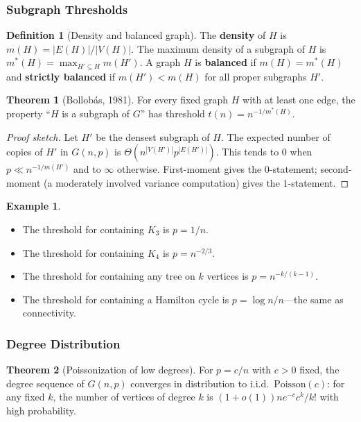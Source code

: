 \documentclass{article}
\theoremstyle{definition}
\newtheorem{example}{Example}
\newtheorem{theorem}{Theorem}
\newtheorem{definition}{Definition}
\begin{document}
\subsubsection{Subgraph Thresholds}

\begin{definition}[Density and balanced graph]
The \textbf{density} of $H$ is $m(H) = |E(H)|/|V(H)|$. The maximum
density of a subgraph of $H$ is $m^*(H) = \max_{H' \subseteq H} m(H')$.
A graph $H$ is \textbf{balanced} if $m(H) = m^*(H)$ and \textbf{strictly balanced}
if $m(H') < m(H)$ for all proper subgraphs $H'$.
\end{definition}

\begin{theorem}[Bollob\'as, 1981]\label{thm:bollobas-subgraph}
For every fixed graph $H$ with at least one edge, the property ``$H$
is a subgraph of $G$'' has threshold $t(n) = n^{-1/m^*(H)}$.
\end{theorem}

\begin{proof}[Proof sketch]
Let $H'$ be the densest subgraph of $H$. The expected number of copies
of $H'$ in $G(n, p)$ is $\Theta(n^{|V(H')|} p^{|E(H')|})$. This
tends to $0$ when $p \ll n^{-1/m(H')}$ and to $\infty$ otherwise.
First-moment gives the $0$-statement; second-moment (a moderately
involved variance computation) gives the $1$-statement.
\end{proof}

\begin{example}
\mbox{}
\begin{itemize}
  \item The threshold for containing $K_3$ is $p = 1/n$.
  \item The threshold for containing $K_4$ is $p = n^{-2/3}$.
  \item The threshold for containing any tree on $k$ vertices is $p = n^{-k/(k - 1)}$.
  \item The threshold for containing a Hamilton cycle is
        $p = \log n/n$---the same as connectivity.
\end{itemize}
\end{example}

\subsubsection{Degree Distribution}

\begin{theorem}[Poissonization of low degrees]
For $p = c/n$ with $c > 0$ fixed, the degree sequence of $G(n, p)$
converges in distribution to i.i.d.\ $\mathrm{Poisson}(c)$: for any
fixed $k$, the number of vertices of degree $k$ is
$(1 + o(1)) n e^{-c} c^k/k!$ with high probability.
\end{theorem}
\end{document}
